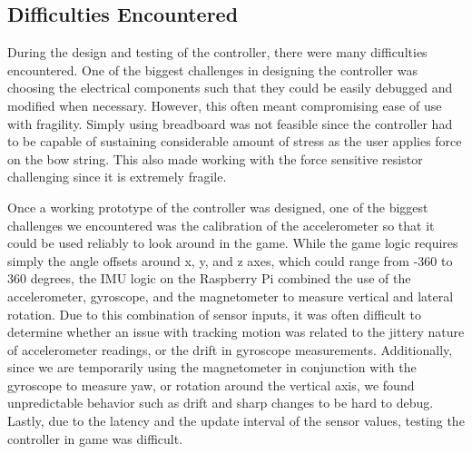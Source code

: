 \documentclass[titlepage, 12pt]{scrartcl}
\begin{document}
    \subsection{Difficulties Encountered}
        During the design and testing of the controller, there were many difficulties encountered. One of the biggest challenges in designing the controller was choosing the electrical components such that they could be easily debugged and modified when necessary. However, this often meant compromising ease of use with fragility. Simply using breadboard was not feasible since the controller had to be capable of sustaining considerable amount of stress as the user applies force on the bow string. This also made working with the force sensitive resistor challenging since it is extremely fragile. \par
        Once a working prototype of the controller was designed, one of the biggest challenges we encountered was the calibration of the accelerometer so that it could be used reliably to look around in the game. While the game logic requires simply the angle offsets around x, y, and z axes, which could range from -360 to 360 degrees, the IMU logic on the Raspberry Pi combined the use of the accelerometer, gyroscope, and the magnetometer to measure vertical and lateral rotation. Due to this combination of sensor inputs, it was often difficult to determine whether an issue with tracking motion was related to the jittery nature of accelerometer readings, or the drift in gyroscope measurements. Additionally, since we are temporarily using the magnetometer in conjunction with the gyroscope to measure yaw, or rotation around the vertical axis, we found unpredictable behavior such as drift and sharp changes to be hard to debug. Lastly, due to the latency and the update interval of the sensor values, testing the controller in game was difficult. \par
\end{document}
